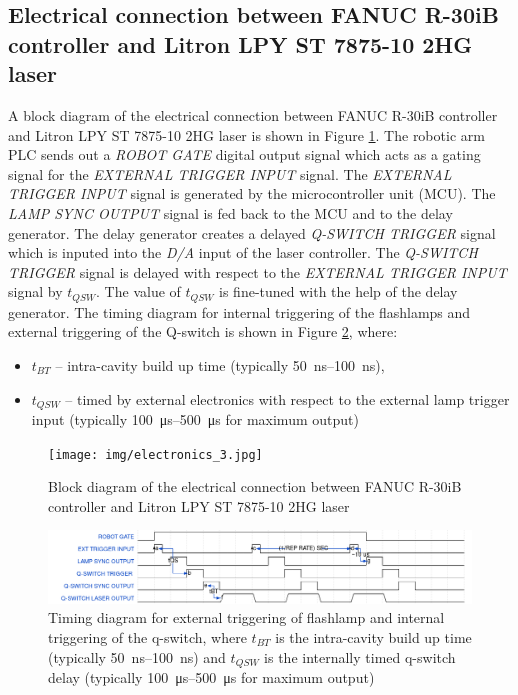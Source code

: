 \subsection{Electrical connection between FANUC R-30iB controller and Litron LPY ST 7875-10 2HG laser}
 \label{sec:electrical_connection}

A block diagram of the electrical connection between FANUC R-30iB controller and Litron LPY ST 7875-10 2HG laser is shown in Figure \ref{fig:electronics}. The robotic arm PLC sends out a \textit{ROBOT GATE} digital output signal which acts as a gating signal for the \textit{EXTERNAL TRIGGER INPUT} signal. The \textit{EXTERNAL TRIGGER INPUT} signal is generated by the microcontroller unit (MCU). The \textit{LAMP SYNC OUTPUT} signal is fed back to the MCU and to the delay generator. The delay generator creates a delayed \textit{Q-SWITCH TRIGGER} signal which is inputed into the \textit{D/A}  input of the laser controller. The \textit{Q-SWITCH TRIGGER} signal is delayed with respect to the \textit{EXTERNAL TRIGGER INPUT} signal by $t_{QSW}$. The value of $t_{QSW}$ is fine-tuned with the help of the delay generator.  The timing diagram for internal triggering of the flashlamps and external triggering of the Q-switch is shown in Figure \ref{fig:wave}, where:

\begin{itemize}
    \item $t_{BT}$ -- intra-cavity build up time (typically \SIrange{50}{100}{\ns}),
    \item $t_{QSW}$ -- timed by external electronics with respect to the external lamp trigger input (typically \SIrange{100}{500}{\us} for maximum output)

\end{itemize}


\begin{figure}[h]
    \centering
    \texttt{[image: img/electronics\_3.jpg]}
    \caption{Block diagram of the electrical connection between FANUC R-30iB controller and Litron LPY ST 7875-10 2HG laser}
    \label{fig:electronics}
\end{figure}

\begin{figure}[h]
    \centering
    \includegraphics[width=1.0\linewidth]{img/wavedrom_bigger.png}
    \caption{Timing diagram for external triggering of flashlamp and internal triggering of the q-switch, where $t_{BT}$ is the intra-cavity build up time (typically \SIrange{50}{100}{\ns}) and $t_{QSW}$ is the internally timed q-switch delay (typically \SIrange{100}{500}{\us} for maximum output)}
    \label{fig:wave}
\end{figure}


